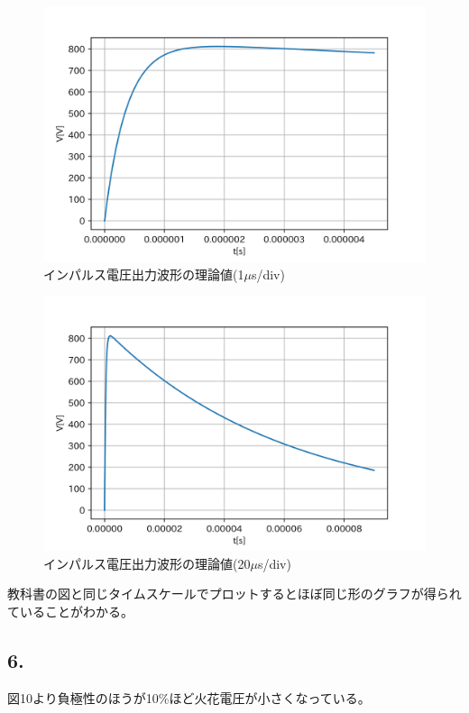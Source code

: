 \documentclass[dvipdfmx, twocolumn]{jsarticle}
\begin{document}
\begin{figure}[H]
\begin{center}
\includegraphics[scale = 0.5]{20_1.png}
\caption{インパルス電圧出力波形の理論値(1$\mu$s/div)}
\end{center}
\end{figure}
\begin{figure}[H]
\begin{center}
\includegraphics[scale = 0.5]{20_2.png}
\caption{インパルス電圧出力波形の理論値(20$\mu$s/div)}
\end{center}
\end{figure}

教科書の図と同じタイムスケールでプロットするとほぼ同じ形のグラフが得られていることがわかる。
\subsection*{6.}
図10より負極性のほうが10$\%$ほど火花電圧が小さくなっている。
\end{document}
